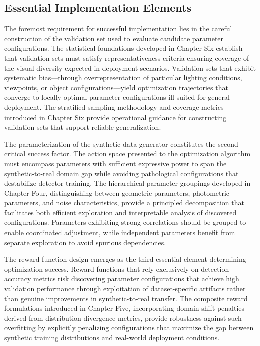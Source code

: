 \subsection{Essential Implementation Elements}
\label{subsec:essential_elements}

The foremost requirement for successful implementation lies in the careful construction of the validation set used to evaluate candidate parameter configurations. The statistical foundations developed in Chapter Six establish that validation sets must satisfy representativeness criteria ensuring coverage of the visual diversity expected in deployment scenarios. Validation sets that exhibit systematic bias---through overrepresentation of particular lighting conditions, viewpoints, or object configurations---yield optimization trajectories that converge to locally optimal parameter configurations ill-suited for general deployment. The stratified sampling methodology and coverage metrics introduced in Chapter Six provide operational guidance for constructing validation sets that support reliable generalization.

The parameterization of the synthetic data generator constitutes the second critical success factor. The action space presented to the optimization algorithm must encompass parameters with sufficient expressive power to span the synthetic-to-real domain gap while avoiding pathological configurations that destabilize detector training. The hierarchical parameter groupings developed in Chapter Four, distinguishing between geometric parameters, photometric parameters, and noise characteristics, provide a principled decomposition that facilitates both efficient exploration and interpretable analysis of discovered configurations. Parameters exhibiting strong correlations should be grouped to enable coordinated adjustment, while independent parameters benefit from separate exploration to avoid spurious dependencies.

The reward function design emerges as the third essential element determining optimization success. Reward functions that rely exclusively on detection accuracy metrics risk discovering parameter configurations that achieve high validation performance through exploitation of dataset-specific artifacts rather than genuine improvements in synthetic-to-real transfer. The composite reward formulations introduced in Chapter Five, incorporating domain shift penalties derived from distribution divergence metrics, provide robustness against such overfitting by explicitly penalizing configurations that maximize the gap between synthetic training distributions and real-world deployment conditions.

